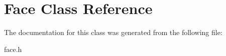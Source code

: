 \hypertarget{class_face}{}\section{Face Class Reference}
\label{class_face}


The documentation for this class was generated from the following file\+:\begin{DoxyCompactItemize}
\item 
face.\+h\end{DoxyCompactItemize}
